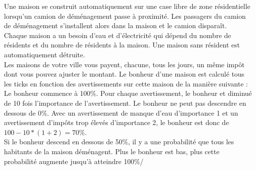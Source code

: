 \documentclass[11pt]{report}
\begin{document}
Une maison se construit automatiquement sur une case libre de zone résidentielle lorsqu'un camion de déménagement passe à proximité. Les passagers du camion de déménagement s'installent alors dans la maison et le camion disparaît.\\
Chaque maison a un besoin d'eau et d'électricité qui dépend du nombre de résidents et du nombre de résidents à la maison. Une maison sans résident est automatiquement détruite.\\
Les maisons de votre ville vous payent, chacune, tous les jours, un même impôt dont vous pouvez ajuster le montant.
Le bonheur d'une maison est calculé tous les ticks en fonction des avertissements sur cette maison de la manière suivante :\\
Le bonheur commence à 100\%. Pour chaque avertissement, le bonheur et diminué de 10 fois l'importance de l'avertissement. Le bonheur ne peut pas descendre en dessous de 0\%.
Avec un avertissement de manque d'eau d'importance 1 et un avertissement d'impôts trop élevés d'importance 2, le bonheur est donc de $100 - 10 * (1 + 2) = 70\%$.\\
Si le bonheur descend en dessous de 50\%, il y a une probabilité que tous les habitants de la maison déménagent. Plus le bonheur est bas, plus cette probabilité augmente jusqu'à atteindre 100\%/
\end{document}

